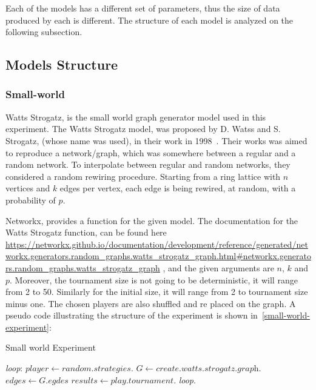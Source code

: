 Each of the models has a different set of parameters, thus the size of
data produced by each is different. The structure of each model is analyzed on
the following subsection.

\subsection{Models Structure}
\label{sub:experiments-structure}
\subsubsection{Small-world}

Watts Strogatz, is the small world graph generator model used in this experiment.
The Watts Strogatz model, was proposed by D. Watss and S. Strogatz,
(whose name was used), in their work in 1998~\cite{Watts1998}.
Their works was aimed to reproduce a network/graph, which was somewhere between
a regular and a random network. To interpolate between regular and random
networks, they considered a random rewiring procedure. Starting from a ring
lattice with \(n\) vertices and \(k\) edges per vertex, each edge is being
rewired, at random, with a probability of \(p\).

Networkx, provides a function for the given model. The documentation for the
Watts Strogatz function, can be found here
\url{https://networkx.github.io/documentation/development/reference/generated/networkx.generators.random_graphs.watts_strogatz_graph.html#networkx.generators.random_graphs.watts_strogatz_graph}
, and the given arguments are \(n\), \(k\) and \(p\). Moreover,
the tournament size is not going to be deterministic, it will
range from 2 to 50. Similarly for the initial size, it will range from 2
to tournament size minus one. The chosen players are also shuffled and re placed
on the graph. A pseudo code illustrating the structure of the experiment is shown
in~\ref{small-world-experiment}:

\begin{algorithm}
	\caption{Small world Experiment}\label{small-world-experiment}
	\begin{algorithmic}
		\BState \emph{loop}:
		\State $player \gets \textit{random.strategies}$.
		\State $G \gets \textit{create.watts.strogatz.graph}$.
		\State $edges \gets \textit{G.egdes}$
		\State $results \gets \textit{play.tournament}$.
		\emph{loop}.
		\EndFor
		\EndFor
		\EndFor
		\EndFor
		\EndProcedure
	\end{algorithmic}
\end{algorithm}

